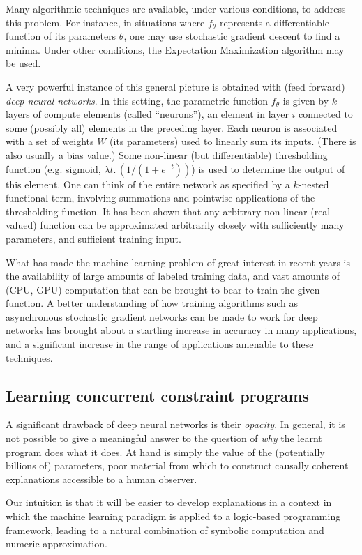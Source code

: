 \documentclass{llncs}
\begin{document}
Many algorithmic techniques are available, under various conditions,
to address this problem. For instance, in situations
where $f_{\theta}$ represents a differentiable function of its
parameters $\theta$, one may use stochastic gradient descent to find a
minima. Under other conditions, the Expectation Maximization algorithm
may be used.

A very powerful instance of this general picture is obtained with
(feed forward) {\em
  deep neural networks}. In this setting, the parametric function
$f_{\theta}$ is given by $k$ layers of compute elements (called
``neurons''), an element in layer $i$ connected to some (possibly all)
elements in the preceding layer. Each neuron is associated with a set
of weights $W$ (its parameters) used to linearly sum its inputs.
(There is also usually a bias value.) Some non-linear
(but differentiable) thresholding function (e.g. sigmoid, $\lambda
t.\,(1/(1+e^{-t}))$) is used to determine the output of this
element. One can think of the entire network as specified by a
$k$-nested functional term, involving summations and pointwise
applications of the thresholding function. It has been shown that any
arbitrary non-linear (real-valued) function can be approximated
arbitrarily closely with sufficiently many parameters, and sufficient
training input. 

What has made the machine learning problem of great interest in recent
years is the availability of large amounts of labeled training data,
and vast amounts of (CPU, GPU) computation that can be brought to bear
to train the given function. A better understanding of how training
algorithms such as asynchronous stochastic gradient networks can be
made to work for deep networks has brought about a startling increase
in accuracy in many applications, and a significant increase in the
range of applications amenable to these techniques.

\subsection{Learning concurrent constraint programs}
A significant drawback of deep neural networks is their {\em
  opacity}. In general, it is not possible to give a meaningful answer
to the question of {\em why} the learnt program does what it
does. At hand is simply the value of the (potentially billions of)
parameters, poor material from which to construct causally coherent
explanations accessible to a human observer.

Our intuition is that it will be easier to develop explanations in a
context in which the machine learning paradigm is applied to a
logic-based programming framework, leading to a natural combination of
symbolic computation and numeric approximation. 
\end{document}
